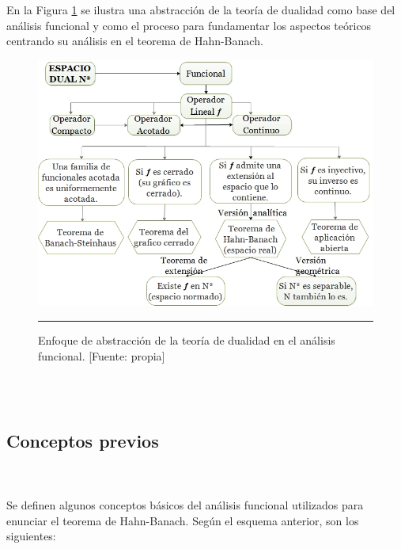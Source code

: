 \documentclass[10pt]{amsart}
\theoremstyle{remark}
\numberwithin{equation}{section}
\begin{document}
En la Figura \ref{02} se ilustra una abstracción de la teoría de dualidad como base del análisis funcional y como el proceso para fundamentar los aspectos teóricos centrando su análisis en el teorema de Hahn-Banach.\\ 
\begin{figure}[h]
\centering
\includegraphics[scale=0.7]{Pic/Esquema02}
\caption{Enfoque de abstracción de la teoría de dualidad en el análisis funcional. [Fuente: propia] \label{02}}	
\hrule
\end{figure}\\ \\


\subsection{Conceptos previos} \ \\ \\
Se definen algunos conceptos básicos del análisis funcional utilizados para enunciar el teorema de Hahn-Banach. Según el esquema anterior, son los siguientes:
\end{document}
